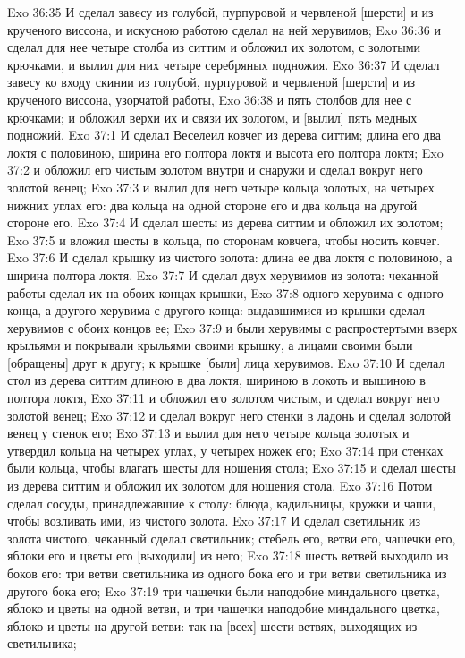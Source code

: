 Exo 36:35  И сделал завесу из голубой, пурпуровой и червленой [шерсти] и из крученого виссона, и искусною работою сделал на ней херувимов;
Exo 36:36  и сделал для нее четыре столба из ситтим и обложил их золотом, с золотыми крючками, и вылил для них четыре серебряных подножия.
Exo 36:37  И сделал завесу ко входу скинии из голубой, пурпуровой и червленой [шерсти] и из крученого виссона, узорчатой работы,
Exo 36:38  и пять столбов для нее с крючками; и обложил верхи их и связи их золотом, и [вылил] пять медных подножий.
Exo 37:1  И сделал Веселеил ковчег из дерева ситтим; длина его два локтя с половиною, ширина его полтора локтя и высота его полтора локтя;
Exo 37:2  и обложил его чистым золотом внутри и снаружи и сделал вокруг него золотой венец;
Exo 37:3  и вылил для него четыре кольца золотых, на четырех нижних углах его: два кольца на одной стороне его и два кольца на другой стороне его.
Exo 37:4  И сделал шесты из дерева ситтим и обложил их золотом;
Exo 37:5  и вложил шесты в кольца, по сторонам ковчега, чтобы носить ковчег.
Exo 37:6  И сделал крышку из чистого золота: длина ее два локтя с половиною, а ширина полтора локтя.
Exo 37:7  И сделал двух херувимов из золота: чеканной работы сделал их на обоих концах крышки,
Exo 37:8  одного херувима с одного конца, а другого херувима с другого конца: выдавшимися из крышки сделал херувимов с обоих концов ее;
Exo 37:9  и были херувимы с распростертыми вверх крыльями и покрывали крыльями своими крышку, а лицами своими были [обращены] друг к другу; к крышке [были] лица херувимов.
Exo 37:10  И сделал стол из дерева ситтим длиною в два локтя, шириною в локоть и вышиною в полтора локтя,
Exo 37:11  и обложил его золотом чистым, и сделал вокруг него золотой венец;
Exo 37:12  и сделал вокруг него стенки в ладонь и сделал золотой венец у стенок его;
Exo 37:13  и вылил для него четыре кольца золотых и утвердил кольца на четырех углах, у четырех ножек его;
Exo 37:14  при стенках были кольца, чтобы влагать шесты для ношения стола;
Exo 37:15  и сделал шесты из дерева ситтим и обложил их золотом для ношения стола.
Exo 37:16  Потом сделал сосуды, принадлежавшие к столу: блюда, кадильницы, кружки и чаши, чтобы возливать ими, из чистого золота.
Exo 37:17  И сделал светильник из золота чистого, чеканный сделал светильник; стебель его, ветви его, чашечки его, яблоки его и цветы его [выходили] из него;
Exo 37:18  шесть ветвей выходило из боков его: три ветви светильника из одного бока его и три ветви светильника из другого бока его;
Exo 37:19  три чашечки были наподобие миндального цветка, яблоко и цветы на одной ветви, и три чашечки наподобие миндального цветка, яблоко и цветы на другой ветви: так на [всех] шести ветвях, выходящих из светильника;
